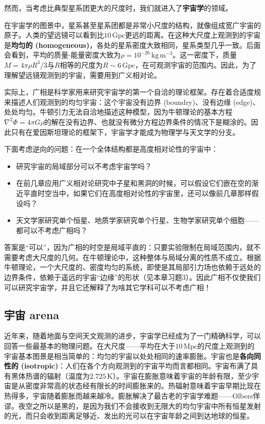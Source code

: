然而，当考虑比典型星系团更大的尺度时，我们就进入了\textbf{宇宙学}的领域。

在宇宙学的图景中，星系甚至星系团都是非常小尺度的结构，就像组成宽广宇宙的原子。人类的望远镜可以看到比$10 \,\text{Gpc}$更远的距离。在这种大尺度上观测到的宇宙是\textbf{均匀的 (homogeneous)}，各处的星系密度大致相同，星系类型几乎一致。后面会看到，平均的质量-能量密度大致为$\rho = 10^{-26} \,\text{kg}\,\mathrm{m}^{-3}$。这一密度下，质量$M = 4\pi \rho R^3 / 3$与$R$相等的尺度为$R \sim 6\,\text{Gpc}$，在可观测宇宙的范围内。因此，为了理解望远镜观测到的宇宙，需要用到广义相对论。

实际上，广相是科学家用来研究宇宙学的第一个自洽的理论框架。存在着合适度规来描述人们观测到的均匀宇宙：这个宇宙没有边界 (boundry)、没有边缘 (edge)、处处均匀。牛顿引力无法自洽地描述这种模型，因为牛顿理论的基本方程$\nabla^2 \Phi = 4\pi G \rho$的解在没有边界、也就没有微分方程边界条件的情况下是糊涂的。因此只有在爱因斯坦理论的框架下，宇宙学才能成为物理学与天文学的分支。

下面考虑逆向的问题：在一个全体结构都是高度相对论性的宇宙中：
\begin{itemize}
\item 研究宇宙的局域部分可以不考虑宇宙学吗？
\item 在前几章应用广义相对论研究中子星和黑洞的时候，可以假设它们嵌在空的渐近平直时空当中，如果它们在高度相对论性的宇宙里，还可以像前几章那样假设吗？
\item 天文学家研究单个恒星、地质学家研究单个行星、生物学家研究单个细胞——都可以不考虑广相吗？
\end{itemize}
答案是“可以”，因为广相的时空是局域平直的：只要实验限制在局域范围内，就不需要考虑大尺度的几何。在牛顿理论中，这种整体与局域分离的性质不成立。根据牛顿理论，一个大尺度的、密度均匀的系统，即使是其局部引力场也依赖于远处的边界条件，依赖于遥远的宇宙“边缘”的形状（见本章习题3）。因此广相不仅使我们可以研究宇宙学，并且它还解释了为啥其它学科可以不考虑广相！

\subsection*{宇宙  arena }
近年来，随着地面与空间天文观测的进步，宇宙学已经成为了一门精确科学，可以回答一些最基本的物理问题。在大尺度——平均在大于$10\, \text{Mpc}$的尺度上观测到的宇宙基本图景是相当简单的：均匀的宇宙以处处相同的速率膨胀。宇宙也是\textbf{各向同性的 (isotropic)}：人们在各个方向观测到的宇宙平均而言都相同。宇宙布满了具有黑体热谱的辐射（温度为$2.725 \,\text{K}$）。宇宙在膨胀意味着宇宙的年龄有限，至少宇宙是从密度非常高的状态经有限长的时间膨胀来的。热辐射意味着宇宙早期比现在热得多，宇宙随着膨胀而越来越冷。膨胀解决了最古老的宇宙学难题——Olbers佯谬。夜空之所以是黑的，是因为我们不会接收到无限大的均匀宇宙中所有恒星发射的光，而只会收到距离足够近、发出的光可以在宇宙年龄之间到达地球的恒星。

